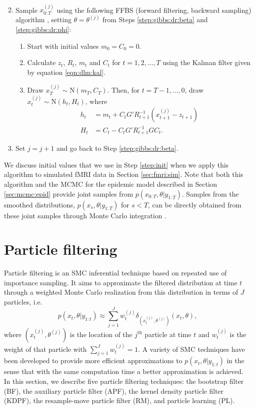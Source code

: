 \begin{enumerate}
\begin{align}
\end{align}
\item \label{step:ffbs} Sample $x_{0:T}^{(j)}$ using the following FFBS (forward filtering, backward sampling) algorithm \cite[Section 4.4][]{petris:camp:2009:dynamic}, setting $\theta = \theta^{(j)}$ from Steps \ref{step:gibbs:dr:beta} and \ref{step:gibbs:dr:phi}:
\begin{enumerate}
\item \label{ffbs:init} Start with initial values $m_0 = C_0 = 0$.
\item \label{ffbs:kal} Calculate $z_t$, $R_t$, $m_t$ and $C_t$ for $t = 1,2,\ldots,T$ using the Kalman filter given by equation \eqref{eqn:dlm:kal}.
\item \label{ffbs:sample} Draw $x_T^{(j)} \sim \mbox{N}(m_T,C_T)$. Then, for $t = T-1,\ldots,0$, draw $x_t^{(j)} \sim \mbox{N}(h_t,H_t)$, where
    \begin{align*}
    h_t &= m_t + C_tG'R_{t+1}^{-1}(x_{t+1}^{(j)} - z_{t+1}) \\
    H_t &= C_t - C_tG'R_{t+1}^{-1}GC_t.
    \end{align*}
\end{enumerate}
\item Set $j = j + 1$ and go back to Step \ref{step:gibbs:dr:beta}.
\end{enumerate}
We discuss initial values that we use in Step \ref{step:init} when we apply this algorithm to simulated fMRI data in Section \ref{sec:fmri:sim}. Note that both this algorithm and the MCMC for the epidemic model described in Section \ref{sec:mcmc:epid} provide joint samples from $p(x_{0:T},\theta|y_{1:T})$. Samples from the smoothed distributions, $p(x_s,\theta|y_{1:T})$ for $s < T$, can be directly obtained from these joint samples through Monte Carlo integration \cite[Chapter 3][]{Robe:Case:mont:2004}.

\section{Particle filtering \label{sec:filtering}}

Particle filtering is an SMC inferential technique based on repeated use of importance sampling. It aims to approximate the filtered distribution at time $t$ through a weighted Monte Carlo realization from this distribution in terms of $J$ particles, i.e.
\begin{equation}
p(x_t,\theta| y_{1:t}) \approx \sum_{j=1}^J w_t^{(j)} \delta_{\left(x_t^{(j)},\theta^{(j)}\right)}(x_t,\theta), \label{eqn:approx}
\end{equation}
where $\left(x_t^{(j)},\theta^{(j)}\right)$ is the location of the $j^{\mbox{th}}$ particle at time $t$ and $w_t^{(j)}$ is the weight of that particle with $\sum_{j=1}^J w_t^{(j)}=1$. A variety of SMC techniques have been developed to provide more efficient approximations to $p(x_t,\theta|y_{1:t})$ in the sense that with the same computation time a better approximation is achieved. In this section, we describe five particle filtering techniques: the bootstrap filter (BF), the auxiliary particle filter (APF), the kernel density particle filter (KDPF), the resample-move particle filter (RM), and particle learning (PL).

